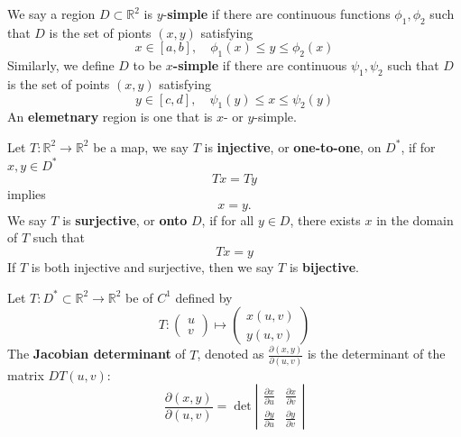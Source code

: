 \documentclass[openany]{book}
\newcommand{\R}{\mathbb{R}}
\begin{document}
\begin{defn}
    We say a region $D\subset\R^2$ is \boldmath$y$\unboldmath-\textbf{simple} if there are continuous functions $\phi_1,\phi_2$ such that $D$ is the set of pionts $(x,y)$ satisfying
    \begin{equation*}
        x\in[a,b], \quad  \phi_1(x)\leq y\leq\phi_2(x)
    \end{equation*}
    Similarly, we define $D$ to be \boldmath$x$\textbf{-simple} \unboldmath if there are continuous $\psi_1, \psi_2$ such that $D$ is the set of points $(x,y)$ satisfying 
    \begin{equation*}
        y\in[c,d], \quad \psi_1(y)\leq x\leq\psi_2(y)
    \end{equation*}
    An \textbf{elemetnary} region is one that is $x$- or $y$-simple.
\end{defn}



\begin{defn}
    Let $T:\R^2\to\R^2$ be a map, we say $T$ is \textbf{injective}, or \textbf{one-to-one}, on $D^*$, if for $x,y\in D^*$
    \begin{equation*}
        Tx=Ty
    \end{equation*}
    implies
    \begin{equation*}
        x=y.
    \end{equation*}
    We say $T$ is \textbf{surjective}, or \textbf{onto} $D$, if for all $y\in D$, there exists $x$ in the domain of $T$ such that 
    \begin{equation*}
        Tx=y
    \end{equation*}
    If $T$ is both injective and surjective, then we say $T$ is \textbf{bijective}.
\end{defn}


\begin{defn}
    Let $T:D^*\subset\R^2\to\R^2$ be of $C^1$ defined by 
    \begin{equation*}
        T:\begin{pmatrix}
            u\\
            v
        \end{pmatrix}\mapsto \begin{pmatrix}
            x(u,v)\\
            y(u,v)
        \end{pmatrix}
    \end{equation*}
    The \textbf{Jacobian determinant} of $T$, denoted as $\frac{\partial(x,y)}{\partial(u,v)}$ is the determinant of the matrix $DT(u,v)$:
    \begin{equation*}
        \frac{\partial(x,y)}{\partial(u,v)}=\det\left|\begin{matrix}
            \frac{\partial x}{\partial u}& \frac{\partial x}{\partial v}\\
            \frac{\partial y}{\partial u}&\frac{\partial y}{\partial v}
        \end{matrix}\right|
    \end{equation*}
\end{defn}
\end{document}
